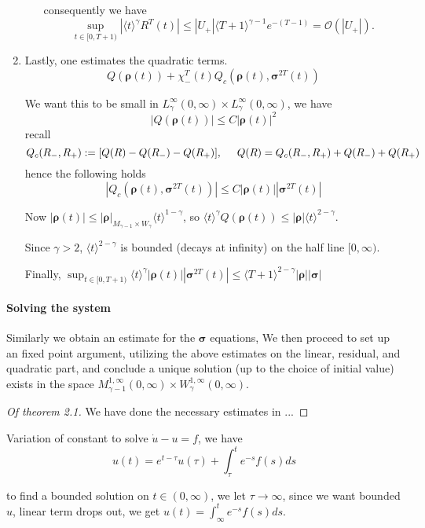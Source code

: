\documentclass[letterpaper,11pt]{article}
\newcommand{\rmO}{\mathcal{O}}
\newcommand{\Rho}{\bm{\rho}}
\newcommand{\bigma}{\bm{\sigma}}
\numberwithin{equation}{section}
\theoremstyle{plain}
\begin{document}
\begin{enumerate}
\begin{enumerate}
consequently we have
\[
\sup_{t \in [0,T+1)} \left|\langle t \rangle^\gamma R^T(t)\right| \le |U_+| \langle T+1 \rangle^{\gamma-1} e^{-(T-1)} = \rmO(|U_+|).
\]
\end{enumerate}
\item 
Lastly, one estimates the quadratic terms.
\[
Q(\bm{\rho}(t))+\chi_-^T(t)Q_c(\bm{\rho}(t),\bm{\sigma}^{2T}(t))
\]

We want this to be small in $L_{\gamma}^\infty(0,\infty) \times L_\gamma^\infty(0,\infty)$, we have
\[
|Q(\Rho(t))| \le C|\Rho(t)|^2
\]
recall
\[
Q_c(R_-,R_+) := [Q(R)-Q(R_-)-Q(R_+)], \hspace{0.5cm} Q(R) = Q_c(R_-,R_+)+ Q(R_-)+Q(R_+)
\]
hence the following holds
\[
|Q_c(\Rho(t), \bigma^{2T}(t) ) | \le C|\Rho(t)| | \bigma^{2T}(t) |
\]

Now $|\Rho(t)| \le |\Rho|_{M_{\gamma-1}\times W_\gamma} \langle t\rangle^{1-\gamma}$, so $\langle t \rangle^{\gamma}Q(\Rho(t)) \le |\Rho| \langle t \rangle^{2-\gamma}$.

Since $\gamma>2$, $\langle t \rangle^{2-\gamma}$ is bounded (decays at infinity) on the half line $[0,\infty)$.

Finally, $\sup_{t \in [0,T+1)} \langle t\rangle^{\gamma}|\Rho(t)||\bigma^{2T}(t)| \le \langle T+1 \rangle^{2-\gamma}  |\Rho||\bigma| $

\end{enumerate}

\paragraph{Solving the system}
Similarly we obtain an estimate for the $\bigma$ equations,
We then proceed to set up an fixed point argument, utilizing the above estimates on the linear, residual, and quadratic part, and conclude a unique solution (up to the choice of initial value) exists in the space $M_{\gamma-1}^{1,\infty}(0,\infty) \times W_{\gamma}^{1,\infty}(0,\infty)$.

\begin{proof}[Of theorem 2.1]
We have done the necessary estimates in ...
\end{proof}


Variation of constant
to solve $\dot{u} - u =f$, we have 
\[
 u(t) = e^{t-\tau}u(\tau) + \int_\tau^t e^{-s}f(s)ds
\]

to find a bounded solution on $t \in (0,\infty)$, we let $\tau \to \infty$, since we want bounded $u$, linear term drops out, we get $u(t) = \int_\infty^t e^{-s}f(s)ds$.
\end{document}
